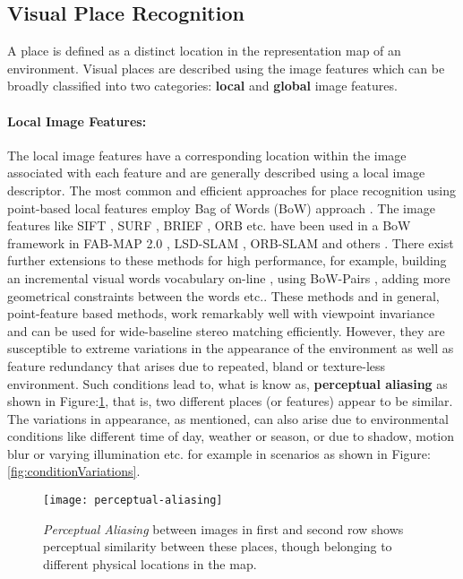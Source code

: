 \documentclass{article}
\begin{document}
\subsection{Visual Place Recognition}
A place is defined as a distinct location in the representation map of an environment. Visual places are described using the image features which can be broadly classified into two categories: \textbf{local} and \textbf{global} image features. 

\paragraph{Local Image Features:} The local image features have a corresponding location within the image associated with each feature and are generally described using a local image descriptor. The most common and efficient approaches for place recognition using point-based local features employ Bag of Words (BoW) approach \cite{Nister2006,Sivic2003}. The image features like SIFT \cite{Lowe2004}, SURF \cite{Bay2008}, BRIEF \cite{Calonder2010}, ORB \cite{Rublee2011} etc. have been used in a BoW framework in FAB-MAP 2.0 \cite{Cummins2010}, LSD-SLAM \cite{Engel2014lsd}, ORB-SLAM \cite{Mur-Artal2015} and others \cite{Galvez-Lopez2012, Mur-Artal2014}. There exist further extensions to these methods for high performance, for example, building an incremental visual words vocabulary on-line \cite{Angeli2008}, using BoW-Pairs \cite{kejriwal2016high}, adding more geometrical constraints between the words \cite{CADENA} etc.. These methods and in general, point-feature based methods, work remarkably well with viewpoint invariance and can be used for wide-baseline stereo matching efficiently. However, they are susceptible to extreme variations in the appearance of the environment as well as feature redundancy that arises due to repeated, bland or texture-less environment. Such conditions lead to, what is know as, \textbf{perceptual aliasing} as shown in Figure:\ref{fig:perceptualAliasing}, that is, two different places (or features) appear to be similar. The variations in appearance, as mentioned, can also arise due to environmental conditions like different time of day, weather or season, or due to shadow, motion blur or varying illumination etc. for example in scenarios as shown in Figure:\ref{fig:conditionVariations}.

\begin{figure}[htbp]
\centering
 \texttt{[image: perceptual-aliasing]}
 \caption{\emph{Perceptual Aliasing} between images in first and second row shows perceptual similarity between these places, though belonging to different physical locations in the map. \cite{cummins2007probabilistic}}
 \label{fig:perceptualAliasing}
\end{figure}
\end{document}
